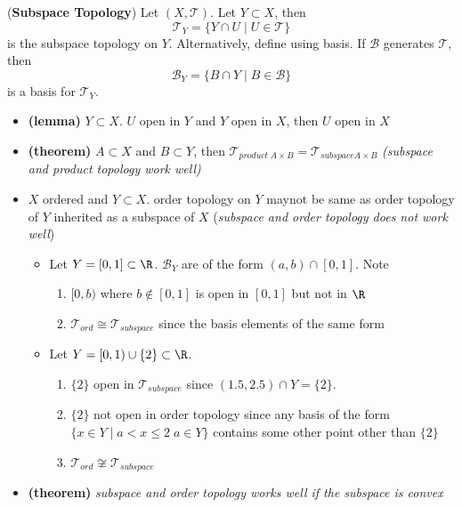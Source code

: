 \documentclass[10.5pt]{article}
\newcommand{\calB}{\mathcal{B}}
\newcommand{\calT}{\mathcal{T}}
\begin{document}
\begin{defn*}
    (\textbf{Subspace Topology}) Let $(X,\calT)$. Let $Y\subset X$, then 
    \[
        \calT_Y = \{Y\cap U \mid U \in \calT\}
    \]
    is the subspace topology on $Y$. Alternatively, define using basis. If $\calB$ generates $\calT$, then 
    \[
        \calB_Y = \{B\cap Y \mid B \in \calB \}    
    \]
    is a basis for $\calT_Y$. 
    \begin{itemize}
        \item \textbf{(lemma)} $Y\subset X$. $U$ open in $Y$ and $Y$ open in $X$, then $U$ open in $X$
        \item \textbf{(theorem)} $A\subset X$ and $B\subset Y$, then $\calT_{product \; A\times B} = \calT_{subspace A\times B}$ \textit{(subspace and product topology work well)}
        \item $X$ ordered and $Y\subset X$. order topology on $Y$ maynot be same as order topology of $Y$ inherited as a subspace of $X$ (\textit{subspace and order topology does not work well})
        \begin{itemize}
            \item Let $Y=[0,1] \subset \R$. $\calB_Y$ are of the form $(a,b) \cap [0,1]$. Note
            \begin{enumerate}
                \item $[0,b)$ where $b\not\in [0,1]$ is open in $[0,1]$ but not in $\R$
                \item $\calT_{ord} \cong \calT_{subspace}$ since the basis elements of the same form
            \end{enumerate}
            \item Let $Y=[0,1) \cup \{2\} \subset \R$. 
            \begin{enumerate}
                \item $\{2\}$ open in $\calT_{subspace}$ since $(1.5,2.5) \cap Y = \{2\}$. 
                \item  $\{2\}$ not open in order topology since any basis of the form $\{x \in Y \mid a < x \leq 2 \; a\in Y\}$ contains some other point other than $\{2\}$
                \item $\calT_{ord} \not\cong \calT_{subspace}$
            \end{enumerate}
        \end{itemize}
        \item \textbf{(theorem)} \textit{subspace and order topology works well if the subspace is convex}
    \end{itemize}
\end{defn*}
\end{document}
